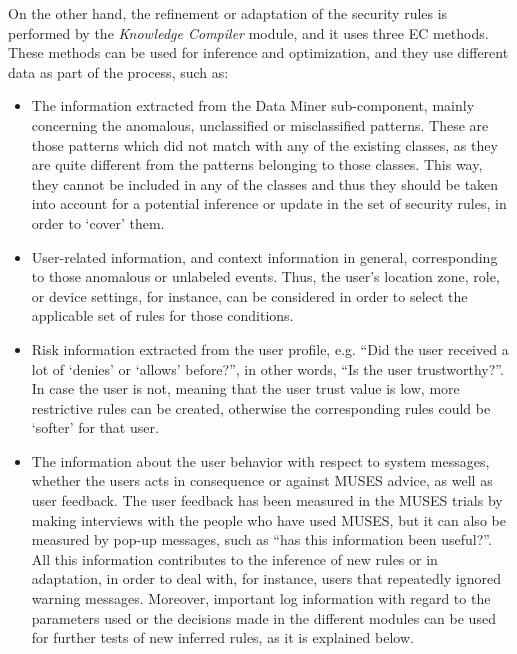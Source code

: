 On the other hand, the refinement or adaptation of the security rules is performed by the \textit{Knowledge Compiler} module, and it uses three EC methods. These methods can be used for inference and optimization, and they use different data as part of the process, such as:

\begin{itemize}

\item The information extracted from the Data Miner sub-component, mainly concerning the anomalous, unclassified or misclassified patterns. These are those patterns which did not match with any of the existing classes, as they are quite different from the patterns belonging to those classes. This way, they cannot be included in any of the classes and thus they should be taken into account for a potential inference or update in the set of security rules, in order to `cover' them.

\item User-related information, and context information in general, corresponding to those anomalous or unlabeled events. Thus, the user's location zone, role, or device settings, for instance, can be considered in order to select the applicable set of rules for those conditions.

\item Risk information extracted from the user profile, e.g. ``Did the user received a lot of `denies' or `allows' before?'', in other words, ``Is the user trustworthy?''. In case the user is not, meaning that the user trust value is low, more restrictive rules can be created, otherwise the corresponding rules could be `softer' for that user.

\item The information about the user behavior with respect to system messages, whether the users acts in consequence or against MUSES advice, as well as user feedback. The user feedback has been measured in the MUSES trials by making interviews with the people who have used MUSES, but it can also be measured by pop-up messages, such as ``has this information been useful?''. 
All this information contributes to the inference of new rules or in adaptation, in order to deal with, for instance, users that repeatedly ignored warning messages.
Moreover, important log information with regard to the parameters used or the decisions made in the different modules can be used for further tests of new inferred rules, as it is explained below.

\end{itemize}

